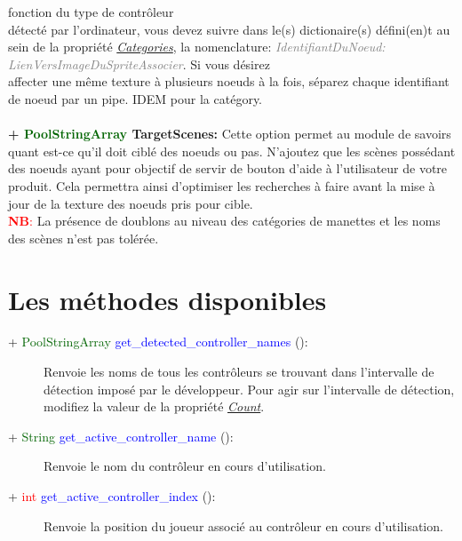 \documentclass[a4paper, 11pt]{article}
\begin{document}
	fonction du type de contrôleur \\détecté par l'ordinateur, vous devez suivre dans le(s) dictionaire(s) 
	défini(en)t au sein de la propriété \textit{\hyperlink{cat}{Categories}}, la nomenclature:
	\textit{\textcolor{gray}{IdentifiantDuNoeud: LienVersImageDuSpriteAssocier}}. Si vous désirez \\affecter 
	une même texture à plusieurs noeuds à la fois, séparez chaque identifiant de noeud par un pipe. IDEM
	pour la catégory.\\\\
	\textbf{+ \textcolor{darkgreen}{PoolStringArray} TargetScenes:} Cette option permet au module de savoirs 
	quant est-ce qu'il doit ciblé des noeuds ou pas. N'ajoutez que les scènes possédant des noeuds ayant 
	pour objectif de servir de bouton d'aide à l'utilisateur de votre produit. Cela permettra ainsi 
	d'optimiser les recherches à faire avant la mise à jour de la texture des noeuds pris pour cible.\\
	\textcolor{red}{\textbf{NB}:} La présence de doublons au niveau des catégories de manettes et les noms 
	des scènes n'est pas tolérée.

	\section{Les méthodes disponibles}
	\begin{description}
		\item [+ \textcolor{darkgreen}{PoolStringArray} \textcolor{blue}{get\_detected\_controller\_names} 
		():] Renvoie les noms de tous les contrôleurs se trouvant dans l'intervalle de détection imposé par
		le développeur. Pour agir sur l'intervalle de détection, modifiez la valeur de la propriété
		\textit{\hyperlink{count}{Count}}.\\
	\end{description}
	\begin{description}
		\item [+ \textcolor{darkgreen}{String} \textcolor{blue}{get\_active\_controller\_name} ():] Renvoie 
		le nom du contrôleur en cours d'utilisation.\\
	\end{description}
	\begin{description}
		\item [+ \textcolor{red}{int} \textcolor{blue}{get\_active\_controller\_index} ():] Renvoie la 
		position du joueur associé au contrôleur en cours d'utilisation.
	\end{description}
\end{document}
